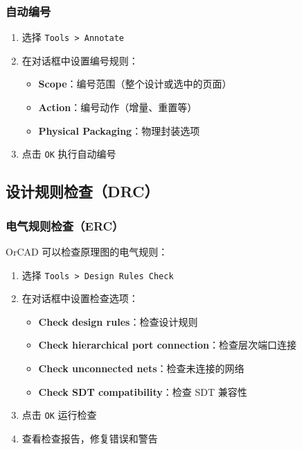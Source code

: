 \subsubsection{自动编号}


\begin{enumerate}
  \item 选择 \lstinline{Tools > Annotate}
  \item 在对话框中设置编号规则：
    \begin{itemize}
      \item \textbf{Scope}：编号范围（整个设计或选中的页面）
      \item \textbf{Action}：编号动作（增量、重置等）
      \item \textbf{Physical Packaging}：物理封装选项
    \end{itemize}
  \item 点击 \lstinline{OK} 执行自动编号
\end{enumerate}

\subsection{设计规则检查（DRC）}

\subsubsection{电气规则检查（ERC）}

OrCAD 可以检查原理图的电气规则：


\begin{enumerate}
  \item 选择 \lstinline{Tools > Design Rules Check}
  \item 在对话框中设置检查选项：
    \begin{itemize}
      \item \textbf{Check design rules}：检查设计规则
      \item \textbf{Check hierarchical port connection}：检查层次端口连接
      \item \textbf{Check unconnected nets}：检查未连接的网络
      \item \textbf{Check SDT compatibility}：检查 SDT 兼容性
    \end{itemize}
  \item 点击 \lstinline{OK} 运行检查
  \item 查看检查报告，修复错误和警告
\end{enumerate}

